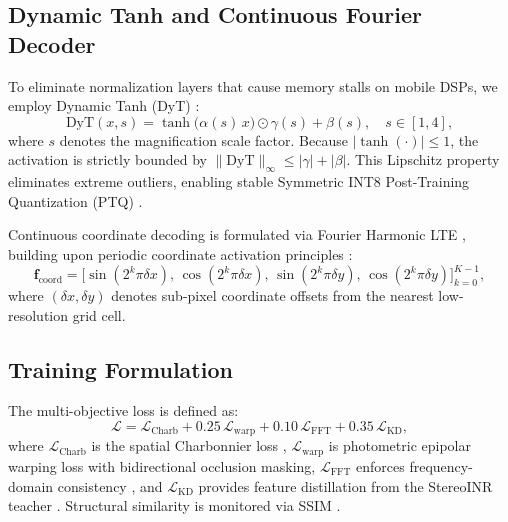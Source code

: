 \documentclass[conference]{IEEEtran}
\begin{document}
\subsection{Dynamic Tanh and Continuous Fourier Decoder}
To eliminate normalization layers that cause memory stalls on mobile DSPs, we employ Dynamic Tanh (DyT) \cite{dyt}:
\begin{equation}
\mathrm{DyT}(x, s) = \tanh\!\big(\alpha(s)\,x\big)\odot\gamma(s) + \beta(s),\quad s \in [1, 4],
\end{equation}
where $s$ denotes the magnification scale factor. Because $|\tanh(\cdot)| \le 1$, the activation is strictly bounded by $\|\mathrm{DyT}\|_\infty \le |\gamma| + |\beta|$. This Lipschitz property eliminates extreme outliers, enabling stable Symmetric INT8 Post-Training Quantization (PTQ) \cite{ptq}.

Continuous coordinate decoding is formulated via Fourier Harmonic LTE \cite{lte, ultrasr}, building upon periodic coordinate activation principles \cite{siren}:
\begin{equation}
\mathbf{f}_{\text{coord}} = \big[\sin(2^k \pi \delta x),\, \cos(2^k \pi \delta x),\, \sin(2^k \pi \delta y),\, \cos(2^k \pi \delta y)\big]_{k=0}^{K-1},
\end{equation}
where $(\delta x, \delta y)$ denotes sub-pixel coordinate offsets from the nearest low-resolution grid cell.

\subsection{Training Formulation}
The multi-objective loss is defined as:
\begin{equation}
\mathcal{L} = \mathcal{L}_{\mathrm{Charb}} + 0.25\,\mathcal{L}_{\mathrm{warp}} + 0.10\,\mathcal{L}_{\mathrm{FFT}} + 0.35\,\mathcal{L}_{\mathrm{KD}},
\end{equation}
where $\mathcal{L}_{\mathrm{Charb}}$ is the spatial Charbonnier loss \cite{lapsrn}, $\mathcal{L}_{\mathrm{warp}}$ is photometric epipolar warping loss with bidirectional occlusion masking, $\mathcal{L}_{\mathrm{FFT}}$ enforces frequency-domain consistency \cite{ffl}, and $\mathcal{L}_{\mathrm{KD}}$ provides feature distillation from the StereoINR teacher \cite{kd}. Structural similarity is monitored via SSIM \cite{ssim}.
\end{document}

